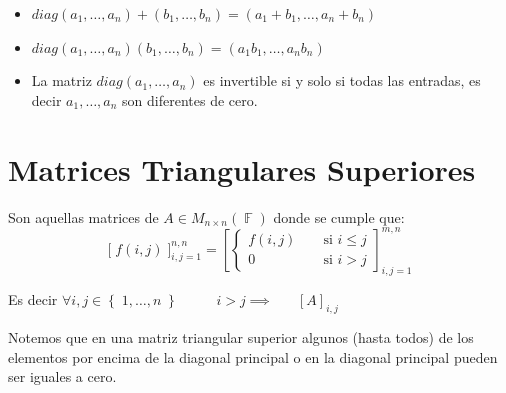 \documentclass[12pt, fleqn]{report}                             %
\DeclareMathOperator \Space     {\quad}                         %
\DeclareMathOperator \MegaSpace {\quad \quad}                   %
\DeclareMathOperator \MiniSpace {\;}                            %
\theoremstyle{break}                                            %
\DeclareMathOperator \GenericField {\mathbb{F}}                 %
\newcommand{\Set}[1]            {\left\{ \; #1 \; \right\}}     %
\newcommand{\Brackets}[1]       {\left[ #1 \right]}             %
\newcommand{\BigBrackets}[1]    {\Big[ \; #1 \; \Big]}          %
\begin{document}
                \begin{itemize}
                    
                    \item
                        $diag(a_1, \dots, a_n) + (b_1, \dots, b_n) = (a_1+b_1, \dots, a_n+b_n)$

                    \item
                        $diag(a_1, \dots, a_n)(b_1, \dots, b_n) = (a_1b_1, \dots, a_nb_n)$

                    \item 
                        La matriz $diag(a_1, \dots, a_n)$ es invertible si y solo si todas las entradas, 
                        es decir $a_1, \dots, a_n$ son diferentes de cero. 

                \end{itemize}



        \clearpage
        \section{Matrices Triangulares Superiores}

            Son aquellas matrices de $A \in M_{n \times n}(\GenericField)$ donde se cumple que: 
            \begin{equation*}
                \BigBrackets{f(i,j)}_{i, j = 1}^{n, n}
                =
                \Brackets{
                    \begin{cases}
                        f(i,j)  \MiniSpace& \text{ si } i \leq j \\
                        0       \MiniSpace& \text{ si } i > j
                    \end{cases}
                }_{i, j = 1}^{m, n}  
            \end{equation*}

            Es decir $\forall i, j \in \Set{1, \dots, n} \MegaSpace i > j \implies \Space [A]_{i, j}$

            \vspace{1em}

            Notemos que en una matriz triangular superior algunos (hasta todos) de los elementos
            por encima de la diagonal principal o en la diagonal principal pueden ser iguales a cero.
\end{document}
